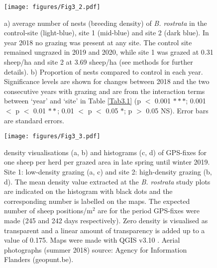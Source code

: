 \documentclass[10pt, twoside]{book} %
\begin{document}
	\clearpage
	\hbox{}\vspace*{\fill}
	\begin{figure}[h!]
		\begin{center}
			\texttt{[image: figures/Fig3\_2.pdf]}
		\end{center}
		\begin{footnotesize}
			\caption{a) average number of nests (breeding density) of \textit{B. rostrata} in the control-site (light-blue), site 1 (mid-blue) and site 2 (dark blue). In year 2018 no grazing was present at any site. The control site remained ungrazed in 2019 and 2020, while site 1 was grazed at 0.31 sheep/ha and site 2 at 3.69 sheep/ha (see methods for further details). b) Proportion of nests compared to control in each year. Significance levels are shown for changes between 2018 and the two consecutive years with grazing and are from the interaction terms between `year' and `site' in Table \ref{Tab3.1} (p $<$ 0.001 $\ast \ast \ast$; 0.001 $<$ p $<$ 0.01 $\ast \ast$; 0.01 $<$ p $<$ 0.05 $\ast$; p $>$ 0.05 NS). Error bars are standard errors. \label{fig3.2}}
		\end{footnotesize}
	\end{figure}
\vspace*{\fill}\clearpage
	\hbox{}\vspace*{\fill}
		\begin{figure}[h!]
		\begin{center}
			\texttt{[image: figures/Fig3\_3.pdf]}
		\end{center}
		\begin{footnotesize}
			\caption{density visualisations (a, b) and histograms (c, d) of GPS-fixes for one sheep per herd per grazed area in late spring until winter 2019. Site 1: low-density grazing (a, c) and site 2: high-density grazing (b, d). The mean density value extracted at the \textit{B. rostrata} study plots are indicated on the histogram with black dots and the corresponding number is labelled on the maps. The expected number of sheep positions/m$^2$ are for the period GPS-fixes were made (245 and 242 days respectively). Zero density is visualised as transparent and a linear amount of transparency is added up to a value of 0.175. Maps were made with QGIS v3.10 \citep{qgisdevelopmentteam2020}. Aerial photographs (summer 2018) source: Agency for Information Flanders (geopunt.be). \label{fig3.3}}
		\end{footnotesize}
	\end{figure}
	\vspace*{\fill}
	\clearpage
\end{document}
